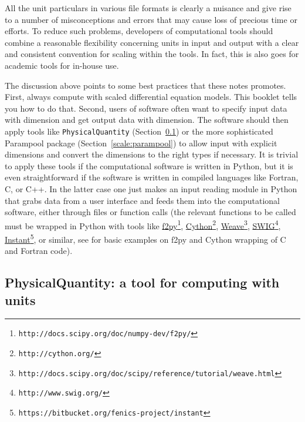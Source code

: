\documentclass[graybox,envcountchap,sectrefs,final]{svmonodo}
\begin{document}
All the unit particulars in various file formats is clearly a nuisance
and give rise to a number of misconceptions and errors that may cause
loss of precious time or efforts. To reduce such problems, developers
of computational tools should combine a reasonable flexibility
concerning units in input and output with a clear and consistent
convention for scaling within the tools. In fact, this is also goes
for academic tools for in-house use.

The discussion above points to some best practices that these notes
promotes. First, always compute with scaled differential equation
models. This booklet tells you how to do that. Second, users of software
often want to specify input data with dimension and get output data
with dimension. The software should then apply tools like
\texttt{PhysicalQuantity} (Section~\ref{scale:PQ})
or the more sophisticated Parampool package (Section~\ref{scale:parampool}) to allow input with explicit dimensions and
convert the dimensions to the right types if necessary.
It is trivial to apply these tools if the computational software is
written in Python, but it is even straightforward if the software is
written in compiled languages like Fortran, C, or C++. In the latter
case one just makes an input reading module in Python that grabs data from
a user interface and feeds them into the computational software, either
through files or function calls (the relevant functions to be called
must be wrapped in Python with tools like
\href{{http://docs.scipy.org/doc/numpy-dev/f2py/}}{f2py}\footnote{\texttt{http://docs.scipy.org/doc/numpy-dev/f2py/}},
\href{{http://cython.org/}}{Cython}\footnote{\texttt{http://cython.org/}},
\href{{http://docs.scipy.org/doc/scipy/reference/tutorial/weave.html}}{Weave}\footnote{\texttt{http://docs.scipy.org/doc/scipy/reference/tutorial/weave.html}},
\href{{http://www.swig.org/}}{SWIG}\footnote{\texttt{http://www.swig.org/}},
\href{{https://bitbucket.org/fenics-project/instant}}{Instant}\footnote{\texttt{https://bitbucket.org/fenics-project/instant}},
or similar, see \cite[Appendix C]{Langtangen_Linge_fdm} for basic
examples on f2py and Cython wrapping of C and Fortran code).

\subsection{PhysicalQuantity: a tool for computing with units}
\label{scale:PQ}

\end{document}
